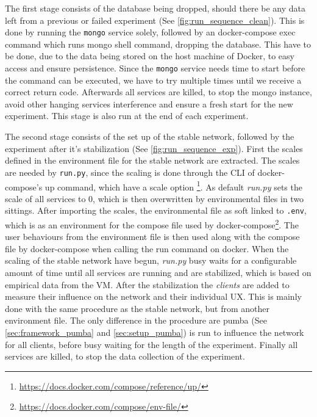 The first stage consists of the database being dropped, should there be any data left from a previous or failed experiment (See \autoref{fig:run_sequence_clean}). This is done by running the \texttt{mongo} service solely, followed by an docker-compose exec command which runs mongo shell command, dropping the database. This have to be done, due to the data being stored on the host machine of Docker, to easy access and ensure persistence. Since the \texttt{mongo} service needs time to start before the command can be executed, we have to try multiple times until  we receive a correct return code. Afterwards all services are killed, to stop the mongo instance, avoid other hanging services interference and ensure a fresh start for the new experiment. This stage is also run at the end of each experiment.




The second stage consists of the set up of the stable network, followed by the experiment after it's stabilization (See \autoref{fig:run_sequence_exp}). First the scales defined in the environment file for the stable network are extracted. The scales are needed by \texttt{run.py}, since the scaling is done through the \ac{CLI} of docker-compose's up command, which have a scale option \footnote{\url{https://docs.docker.com/compose/reference/up/}}. As default \textit{run.py} sets the scale of all services to 0, which is then overwritten by environmental files in two sittings.
After importing the scales, the environmental file as soft linked to \texttt{.env}, which is as an environment for the compose file used by docker-compose\footnote{\url{https://docs.docker.com/compose/env-file/}}.
The user behaviours from the environment file is then used along with the compose file by docker-compose when calling the run command on docker.
When the scaling of the stable network have begun, \textit{run.py} busy waits for a configurable amount of time until all services are running and are stabilized, which is based on empirical data from the \acs{VM}.
After the stabilization the \textit{clients} are added to measure their influence on the network and their individual \acs{UX}. This is mainly done with the same procedure as the stable network, but from another environment file. The only difference in the procedure are pumba (See \autoref{sec:framework_pumba}
 and \ref{sec:setup_pumba}) is run to influence the network for all clients, before busy waiting for the length of the experiment.
Finally all services are killed, to stop the data collection of the experiment.

